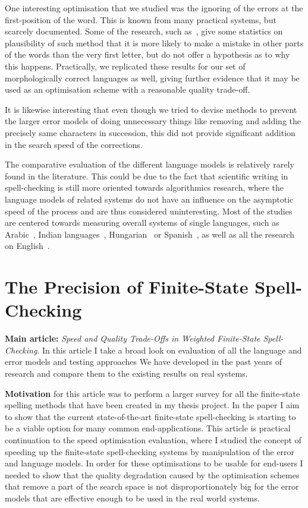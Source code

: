 \documentclass[officiallayout]{unihelcompling}
\begin{document}
One interesting optimisation that we studied was the ignoring of the errors at
the first-position of the word. This is known from many practical systems, but
scarcely documented. Some of the research, such as~\citet{bhagat2007spelling},
give some statistics on plausibility of such method that it is more likely to
make a mistake in other parts of the words than the very first letter, but do
not offer a hypothesis as to why this happens.  Practically, we replicated
these results for our set of morphologically correct languages as well, giving
further evidence that it may be used as an optimisation scheme with a
reasonable quality trade-off.

It is likewise interesting that even though we tried to devise methods to
prevent the larger error models of doing unnecessary things like removing and
adding the precisely same characters in succession, this did not provide
significant addition in the search speed of the corrections.

The comparative evaluation of the different language models is relatively
rarely found in the literature. This could be due to the fact that scientific
writing in spell-checking is still more oriented towards algorithmics research,
where the language models of related systems do not have an influence on the
asymptotic speed of the process and are thus considered uninteresting.  Most of
the studies are centered towards measuring overall systems of single languages,
such as Arabic~\citep{attia2013improved}, Indian
languages~\citep{chaudhuri2002towards}, Hungarian~\citep{tron2005hunmorph} or
Spanish~\cite{otero2007contextual}, as well as all the research on
English~\citep{mitton1987spelling}.

\section{The Precision of Finite-State Spell-Checking}
\label{sec:quality}

\textbf{Main article:} \emph{Speed and Quality Trade-Offs in Weighted
Finite-State Spell-Checking}. In this article I take a broad look on evaluation
of all the language and error models and testing approaches We have developed
in the past years of research and compare them to the existing results on real
systems.

\textbf{Motivation} for this article was to perform a larger survey for all the
finite-state spelling methods that have been created in my thesis project. In
the paper I aim to show that the current state-of-the-art finite-state
spell-checking is starting to be a viable option for many common
end-applications. This article is practical continuation to the speed
optimisation evaluation, where I studied the concept of speeding up the
finite-state spell-checking systems by manipulation of the error and language
models. In order for these optimisations to be usable for end-users I needed to
show that the quality degradation caused by the optimisation schemes that
remove a part of the search space is not disproportionately big for the error
models that are effective enough to be used in the real world systems.
\end{document}
